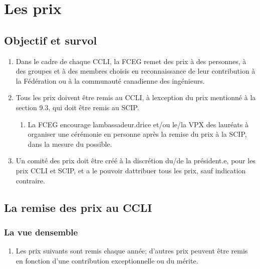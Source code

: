 \section{Les prix}
\label{les-prix}

\subsection{Objectif et survol}
\label{objectif-et-survol}

\begin{enumerate}
 \item
  Dans le cadre de chaque CCLI, la FCEG remet des prix à des personnes, à des groupes et à des membres choisis en reconnaissance de leur contribution à la Fédération ou à la communauté canadienne des ingénieurs.
 \item
  Tous les prix doivent être remis au CCLI, à l\textquotesingle exception du prix mentionné à la section 9.3, qui doit être remis au SCIP.

  \begin{enumerate}
   \item
    La FCEG encourage l\textquotesingle ambassadeur.drice et/ou le/la VPX des lauréats à organiser une cérémonie en personne après la remise du prix à la SCIP, dans la mesure du possible.
  \end{enumerate}
 \item
  Un comité des prix doit être créé à la discrétion du/de la président.e, pour les prix CCLI et SCIP, et a le pouvoir d\textquotesingle attribuer tous les prix, sauf indication contraire.
\end{enumerate}

\subsection{La remise des prix au CCLI}
\label{la-remise-des-prix-au-ccli}

\subsubsection{La vue d\textquotesingle ensemble}
\label{la-vue-densemble}

\begin{enumerate}
 \item
  Les prix suivants sont remis chaque année; d'autres prix peuvent être remis en fonction d'une contribution exceptionnelle ou du mérite.
\end{enumerate}

